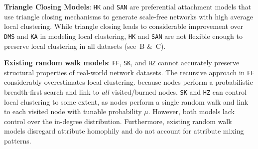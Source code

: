 \textbf{Triangle Closing Models}: \texttt{HK} and \texttt{SAN} are preferential attachment models
that use triangle closing mechanisms to generate scale-free networks with high average
local clustering.
While triangle closing leads to considerable improvement over \texttt{DMS}
and \texttt{KA} in modeling local clustering, \texttt{HK} and \texttt{SAN} are not flexible enough
to preserve local clustering in {all} datasets (see~B \&~C).

\textbf{Existing random walk models}: \texttt{FF}, \texttt{SK}, and \texttt{HZ}
cannot accurately preserve structural properties of real-world network datasets.
The recursive approach in \texttt{FF} considerably overestimates local clustering.
because nodes perform a probabilistic breadth-first search and link to \textit{all} visited/burned
nodes.
\texttt{SK} and \texttt{HZ} can control local clustering to some extent, as
nodes perform a single random walk and link to each visited node with tunable probability $\mu$.
However, both models lack control over the in-degree distribution. Furthermore, existing random walk models
disregard attribute homophily and do not account for attribute mixing patterns.


